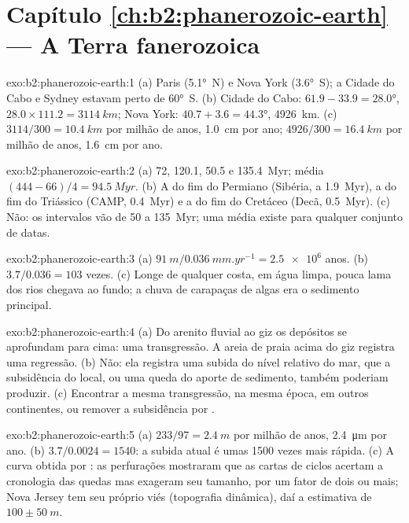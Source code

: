 \section*{Capítulo \ref{ch:b2:phanerozoic-earth} --- A Terra fanerozoica}

\begin{solution}{exo:b2:phanerozoic-earth:1}
(a) Paris (\ang{5.1}~N) e Nova York (\ang{3.6}~S); a Cidade do Cabo e Sydney estavam perto de \ang{60}~S.
(b) Cidade do Cabo: $61.9 - 33.9 = \ang{28.0}$, $28.0 \times 111.2 = \qty{3114}{km}$; Nova York:
$40.7 + 3.6 = \ang{44.3}$, \qty{4926}{km}. (c) $3114/300 = \qty{10.4}{km}$ por milhão de anos,
\qty{1.0}{cm} por ano; $4926/300 = \qty{16.4}{km}$ por milhão de anos, \qty{1.6}{cm} por ano.
\end{solution}

\begin{solution}{exo:b2:phanerozoic-earth:2}
(a) 72, 120.1, 50.5 e \qty{135.4}{Myr}; média $(444 - 66)/4 = \qty{94.5}{Myr}$. (b) A do
fim do Permiano (Sibéria, a \qty{1.9}{Myr}), a do fim do Triássico (CAMP, \qty{0.4}{Myr}) e a do
fim do Cretáceo (Decã, \qty{0.5}{Myr}). (c) Não: os intervalos vão de 50 a
\qty{135}{Myr}; uma média existe para qualquer conjunto de datas.
\end{solution}

\begin{solution}{exo:b2:phanerozoic-earth:3}
(a) $\qty{91}{m}/\qty{0.036}{mm.yr^{-1}} = \num{2.5e6}$ anos. (b) $3.7/0.036 = 103$ vezes. (c)
Longe de qualquer costa, em água limpa, pouca lama dos rios chegava ao fundo; a chuva de
carapaças de algas era o sedimento principal.
\end{solution}

\begin{solution}{exo:b2:phanerozoic-earth:4}
(a) Do arenito fluvial ao giz os depósitos se aprofundam para cima: uma transgressão. A
areia de praia acima do giz registra uma regressão. (b) Não: ela registra uma subida do nível relativo do mar,
que a subsidência do local, ou uma queda do aporte de sedimento, também poderiam produzir. (c)
Encontrar a mesma transgressão, na mesma época, em outros continentes, ou remover a
subsidência por .
\end{solution}

\begin{solution}{exo:b2:phanerozoic-earth:5}
(a) $233/97 = \qty{2.4}{m}$ por milhão de anos, \qty{2.4}{\micro m} por ano. (b) $3.7/0.0024 =
1540$: a subida atual é umas 1500 vezes mais rápida. (c) A curva obtida por : as perfurações mostraram
que as cartas de ciclos acertam a cronologia das quedas mas exageram seu tamanho, por um fator de dois ou
mais; Nova Jersey tem seu próprio viés (topografia dinâmica), daí a estimativa de $100 \pm
\qty{50}{m}$.
\end{solution}

